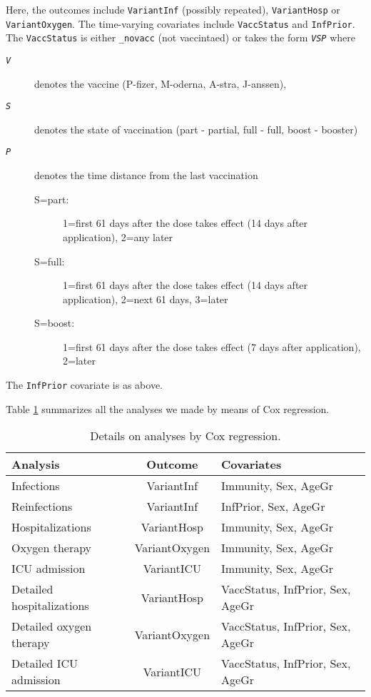 \documentclass[9pt,onecolumn,twoside,lineno]{pnas-new}
\begin{document}
Here, the outcomes include {\tt VariantInf} (possibly repeated),  {\tt VariantHosp} or {\tt VariantOxygen}. The time-varying covariates include  {\tt VaccStatus} and {\tt InfPrior}.
The {\tt VaccStatus} is either {\tt \_novacc} (not vaccintaed) or takes the form {\tt \em VSP} where
\begin{description}
\item[{\tt \em V}] denotes the vaccine (P-fizer, M-oderna, A-stra, J-anssen),
\item[{\tt \em S}] denotes the state of vaccination (part - partial, full - full, boost - booster)
\item[{\tt \em P}] denotes the time distance from the last vaccination
\begin{description}
\item[S=part:] 1=first 61 days after the dose takes effect (14 days after application), 2=any later
\item[S=full:] 1=first 61 days after the dose takes effect (14 days after application), 2=next 61 days, 3=later
\item[S=boost:] 1=first 61 days after the dose takes effect (7 days after application), 2=later 
\end{description}
\end{description}

The {\tt InfPrior} covariate is as above.

\bigskip

Table \ref{tab:anals} summarizes all the analyses we made by means of Cox regression. 

\begin{table}
\caption{Details on analyses by Cox regression. \vspace{1mm}}
\centering
\begin{tabular}{lcl}
\hline
Analysis & Outcome & Covariates \\ \hline
Infections   & VariantInf & 
Immunity, Sex, AgeGr \\
Reinfections & VariantInf & InfPrior, Sex, AgeGr \\
Hospitalizations &  VariantHosp & Immunity, Sex, AgeGr \\
Oxygen therapy &  VariantOxygen & Immunity, Sex, AgeGr \\
ICU admission & VariantICU & Immunity, Sex, AgeGr \\
Detailed hospitalizations &  VariantHosp & VaccStatus, InfPrior, Sex, AgeGr \\
Detailed oxygen therapy &  VariantOxygen & VaccStatus, InfPrior, Sex, AgeGr \\
Detailed ICU admission & VariantICU & VaccStatus, InfPrior, Sex, AgeGr \\
\hline
\end{tabular}
\label{tab:anals}
\end{table}
\end{document}
